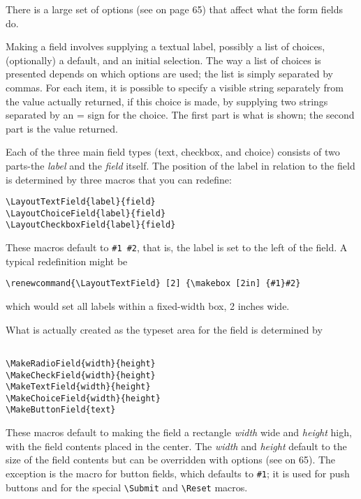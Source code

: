 There is a large set of options (see  on page 65) that affect what the form 
fields do. 

Making a field involves supplying a textual label, possibly a list of choices, (optionally) a default, and an initial selection. The way a list of choices is presented 
depends on which options are used; the list is simply separated by commas. For 
each item, it is possible to specify a visible string separately from the value actually 
returned, if this choice is made, by supplying two strings separated by an = sign for 
the choice. The first part is what is shown; the second part is the value returned. 

Each of the three main field types (text, checkbox, and choice) consists of two 
parts-the \emph{label} and the \emph{field} itself. The position of the label in relation to the field 
is determined by three macros that you can redefine: 

\begin{verbatim}
\LayoutTextField{label}{field} 
\LayoutChoiceField{label}{field} 
\LayoutCheckboxField{label}{field} 
\end{verbatim}

These macros default to \verb|#1 #2|, that is, the label is set to the left of the field. A 
typical redefinition might be 

\begin{verbatim}
\renewcommand{\LayoutTextField} [2] {\makebox [2in] {#1}#2} 
\end{verbatim}

which would set all labels within a fixed-width box, 2 inches wide. 

What is actually created as the typeset area for the field is determined by 

\begin{verbatim}

\MakeRadioField{width}{height} 
\MakeCheckField{width}{height} 
\MakeTextField{width}{height} 
\MakeChoiceField{width}{height} 
\MakeButtonField{text} 

\end{verbatim}

These macros default to making the field a rectangle \emph{width} wide
and \emph{height} high, with the field contents placed in the center.
The \emph{width} and \emph{height} default to the size of the field
contents but can be overridden with options (see  on 65). The
exception is the macro for button fields, which defaults to \verb|#1|;
it is used for push buttons and for the special \verb|\Submit| and
\verb|\Reset| macros. 

